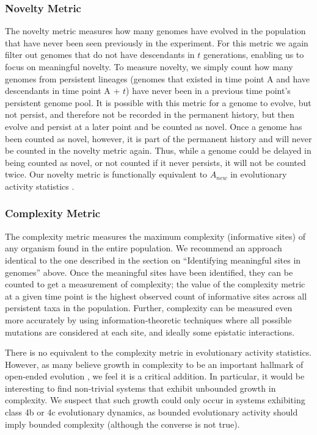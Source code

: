 \documentclass[letterpaper]{article}
\begin{document}
\subsubsection{Novelty Metric}
The novelty metric measures how many genomes have evolved in the population that have never been seen previously in the experiment. For this metric we again filter out genomes that do not have descendants in $t$ generations, enabling us to focus on meaningful novelty. To measure novelty, we simply count how many genomes from persistent lineages (genomes that existed in time point A and have descendants in time point A + $t$) have never been in a previous time point’s persistent genome pool. It is possible with this metric for a genome to evolve, but not persist, and therefore not be recorded in the permanent history, but then evolve and persist at a later point and be counted as novel. Once a genome has been counted as novel, however, it is part of the permanent history and will never be counted in the novelty metric again. Thus, while a genome could be delayed in being counted as novel, or not counted if it never persists, it will not be counted twice. Our novelty metric is functionally equivalent to $A_{new}$ in evolutionary activity statistics \citep{bedau_comparison_1997}.    

\subsubsection{Complexity Metric}
The complexity metric measures the maximum complexity (informative sites) of any organism found in the entire population. We recommend an approach identical to the one described in the section on  ``Identifying meaningful sites in genomes'' above. Once the meaningful sites have been identified, they can be counted to get a measurement of complexity; the value of the complexity metric at a given time point is the highest observed count of informative sites across all persistent taxa in the population. Further, complexity can be measured even more accurately by using %
information-theoretic techniques where all possible mutations are considered at each site, and ideally some epistatic interactions.

There is no equivalent to the complexity metric in evolutionary activity statistics. However, as many believe growth in complexity to be an important hallmark of open-ended evolution \citep{taylor_open-ended_2016}, we feel it is a critical addition. In particular, it would be interesting to find non-trivial systems that exhibit unbounded growth in complexity. We suspect that such growth could only occur in systems exhibiting class 4b or 4c evolutionary dynamics, as bounded evolutionary activity should imply bounded complexity (although the converse is not true).
\end{document}
